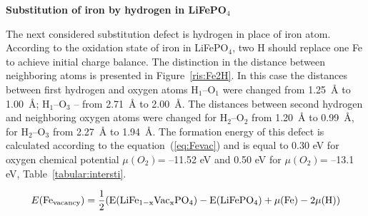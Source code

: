 \par\bigskip
\textbf{Substitution of iron by hydrogen in LiFePO$_4$}

The next considered substitution defect is hydrogen in place of iron atom. According to the oxidation state of iron in LiFePO$_4$, two H should replace one Fe to achieve initial charge balance. The distinction in the distance between neighboring atoms is presented in Figure~\ref{ris:Fe2H}. In this case the distances between first hydrogen and oxygen atoms H$_1$--O$_1$ were changed from 1.25{~\AA} to 1.00{~\AA}; H$_1$--O$_3$ -- from 2.71{~\AA} to 2.00{~\AA}. The distances between second hydrogen and neighboring oxygen atoms were changed for H$_2$--O$_2$ from 1.20{~\AA} to 0.99{~\AA}, for H$_2$--O$_3$ from 2.27{~\AA} to 1.94{~\AA}. The formation energy of this defect is calculated according to the equation~(\ref{eq:Fevac}) and is equal to 0.30 eV for oxygen chemical potential $\mu(O_2)$= --11.52 eV and 0.50 eV for $\mu(O_2)$= --13.1 eV, Table~\ref{tabular:intersti}.

\begin{equation}
\label{eq:Fevac}
E(\rm Fe_{vacancy})=\frac{1}{2}(E(\rm LiFe_{1-x}Vac_{x}PO_4)-E(\rm LiFePO_4)+\mu(\rm Fe)-2\mu(\rm H)) 
\end{equation}

